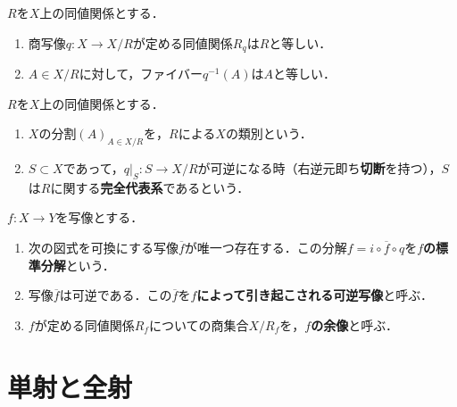 \documentclass[uplatex,dvipdfmx]{jsreport}
\begin{document}
\begin{proposition}
    $R$を$X$上の同値関係とする．
    \begin{enumerate}
        \item 商写像$q:X\to X/R$が定める同値関係$R_q$は$R$と等しい．
        \item $A\in X/R$に対して，ファイバー$q^{-1}(A)$は$A$と等しい．
    \end{enumerate}
\end{proposition}

\begin{definition}
    $R$を$X$上の同値関係とする．
    \begin{enumerate}
        \item $X$の分割$(A)_{A\in X/R}$を，$R$による$X$の類別という．
        \item $S\subset X$であって，$q|_S:S\to X/R$が可逆になる時（右逆元即ち\textbf{切断}を持つ），$S$は$R$に関する\textbf{完全代表系}であるという．
    \end{enumerate}
\end{definition}

\begin{proposition}
    $f:X\to Y$を写像とする．
    \begin{enumerate}
        \item 次の図式を可換にする写像$\overline{f}$が唯一つ存在する．この分解$f=i\circ\overline{f}\circ q$を\textbf{$f$の標準分解}という．\begin{center}\end{center}
        \item 写像$\overline{f}$は可逆である．この$\overline{f}$を\textbf{$f$によって引き起こされる可逆写像}と呼ぶ．
        \item $f$が定める同値関係$R_f$についての商集合$X/R_f$を，\textbf{$f$の余像}と呼ぶ．
    \end{enumerate}
\end{proposition}

\section{単射と全射}
\end{document}

